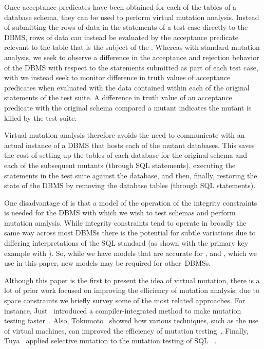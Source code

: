 
 Once acceptance predicates have been obtained for each of the tables of a database schema, they can be used to perform virtual mutation analysis. Instead of submitting the rows of data in the \INSERT statements of a test case directly to the DBMS, rows of data can instead be evaluated by the acceptance predicate relevant to the table that is the subject of the \INSERT. Whereas with standard mutation analysis, we seek to observe a difference in the acceptance and rejection behavior of the DBMS with respect to the \INSERT statements submitted as part of each test case, with \vma we instead seek to monitor difference in truth values of acceptance predicates when evaluated with the data contained within each of the original \INSERT statements of the test suite. A difference in truth value of an acceptance predicate with the original schema compared a mutant indicates the mutant is killed by the test suite.


Virtual mutation analysis therefore avoids the need to communicate with an actual instance of a DBMS that hosts each of the mutant databases. This saves the cost of setting up the tables of each database for the original schema and each of the subsequent mutants (through SQL   statements), executing the \INSERT statements in the test suite against the database, and then, finally, restoring the state of the DBMS by removing the database tables (through SQL   statements).

One disadvantage of \vma is that a model of the operation of the integrity constraints is needed for the DBMS with which we wish to test schemas and perform mutation analysis. While integrity constraints tend to operate in broadly the same way across most DBMSs there is the potential for subtle variations due to differing interpretations of the SQL standard (as shown with the primary key example with \SQLite). So, while we have models that are accurate for \HyperSQL, \Postgres and \SQLite, which we use in this paper, new models may be required for \mbox{other DBMSs}.

 Although this paper is the first to present the idea of virtual mutation, there is a lot of prior work focused on improving the efficiency of mutation analysis; due to space constraints we briefly survey some of the most related approaches. For instance, Just \etal~introduced a compiler-integrated method to make mutation testing faster~\cite{Just2011}. Also, Tokumoto \etal~showed how various techniques, such as the use of virtual machines, can improved the efficiency of mutation testing~\cite{Tokumoto2016}. Finally, Tuya \etal~applied selective mutation to the mutation testing of SQL \SELECTs~\cite{Tuya2007}.


